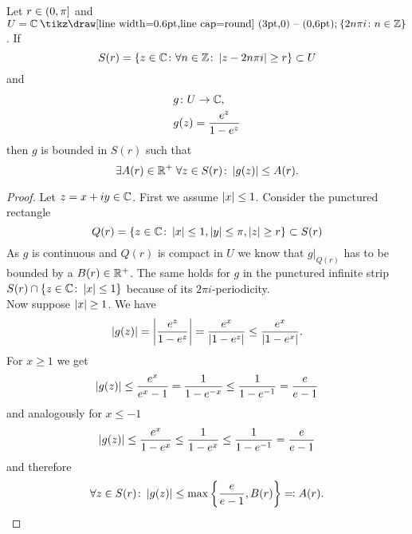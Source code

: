 \begin{lemma}
	Let $r \in \left(0, \pi\right]$ and $U = \field{C} \mysetminus \fbr{2 n \pi i \colon n \in \field{Z}}$. If
\begin{equation*}
	S(r) = \left\{z \in \mathbb{C} \colon \forall n \in \mathbb{Z} \colon \left|z - 2 n \pi i\right| \geq r\right\} \subset U
\end{equation*}
	and
\begin{equation*}
\begin{aligned}
	&g \colon U \to \mathbb{C}, \\
	&g(z) = \frac{e^z}{1 - e^z}
\end{aligned}
\end{equation*}
	then $g$ is bounded in $S(r)$ such that
\begin{equation*}
	\exists A(r) \in \mathbb{R}^+ \; \forall z \in S(r) \colon \left|g(z)\right| \leq A(r).
\end{equation*}
\end{lemma}
\begin{proof}
	Let $z = x + i y \in \mathbb{C}$. First we assume $\left|x\right| \leq 1$. Consider the punctured rectangle
\begin{equation*}
	Q(r) = \left\{z \in \mathbb{C} \colon \left|x\right| \leq 1, \left|y\right| \leq \pi, \left|z\right| \geq r\right\} \subset S(r)
\end{equation*}
	As $g$ is continuous and $Q(r)$ is compact in $U$ we know that $g \big\vert _{Q(r)}$ has to be bounded by a $B(r) \in \mathbb{R}^+$. The same holds for $g$ in the punctured infinite strip $S(r) \cap \left\{z \in \mathbb{C} \colon \left|x\right| \leq 1\right\}$ because of its $2 \pi i$-periodicity. \\
	Now suppose $\left|x\right| \geq 1$. We have
\begin{equation*}
	\left|g(z)\right| = \left|\frac{e^z}{1 - e^z}\right| = \frac{e^x}{\left|1 - e^z\right|} \leq \frac{e^x}{\left|1 - e^x\right|}.
\end{equation*}
	For $x \geq 1$ we get
\begin{equation*}
	\left|g(z)\right| \leq \frac{e^x}{e^x - 1} = \frac{1}{1 - e^{-x}} \leq \frac{1}{1 - e^{-1}} = \frac{e}{e - 1}
\end{equation*}
	and analogously for $x \leq -1$ 
\begin{equation*}
	\left|g(z)\right| \leq \frac{e^x}{1 - e^x} \leq \frac{1}{1 - e^x} \leq \frac{1}{1 - e^{-1}} = \frac{e}{e - 1}
\end{equation*}
	and therefore
\begin{equation*}
	\forall z \in S(r) \colon \left|g(z)\right| \leq \max \left\{\frac{e}{e - 1}, B(r)\right\} \eqqcolon A(r).
\end{equation*}
\end{proof}


